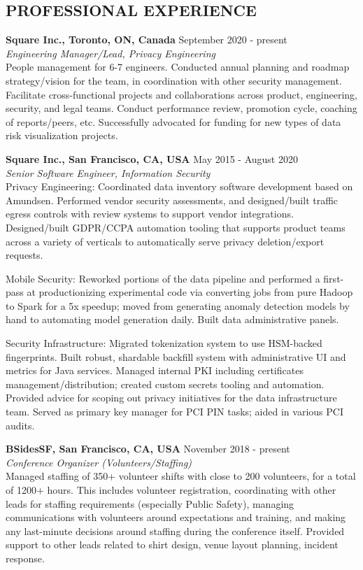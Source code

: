\documentclass[line,margin]{res}
\begin{document}

\address{https://www.shh.sh}
\address{s@shh.sh}
\begin{resume}

\section{PROFESSIONAL EXPERIENCE}
{\bf Square Inc., Toronto, ON, Canada} \hfill {September 2020 - present} \\
{\sl Engineering Manager/Lead, Privacy Engineering}\\
People management for 6-7 engineers. Conducted annual planning and roadmap strategy/vision for the team, in coordination with other security management. Facilitate cross-functional projects and collaborations across product, engineering, security, and legal teams. Conduct performance review, promotion cycle, coaching of reports/peers, etc. Successfully advocated for funding for new types of data risk visualization projects.

{\bf Square Inc., San Francisco, CA, USA} \hfill {May 2015 - August 2020} \\
{\sl Senior Software Engineer, Information Security}\\
Privacy Engineering: Coordinated data inventory software development based on Amundsen. Performed vendor security assessments, and designed/built traffic egress controls with review systems to support vendor integrations. Designed/built GDPR/CCPA automation tooling that supports product teams across a variety of verticals to automatically serve privacy deletion/export requests.

Mobile Security: Reworked portions of the data pipeline and performed a first-pass at productionizing experimental code via converting jobs from pure Hadoop to Spark for a 5x speedup; moved from generating anomaly detection models by hand to automating model generation daily. Built data administrative panels. 

Security Infrastructure: Migrated tokenization system to use HSM-backed fingerprints. Built robust, shardable backfill system with administrative UI and metrics for Java services. Managed internal PKI including certificates management/distribution; created custom secrets tooling and automation. Provided advice for scoping out privacy initiatives for the data infrastructure team. Served as primary key manager for PCI PIN tasks; aided in various PCI audits.

{\bf BSidesSF, San Francisco, CA, USA}  \hfill {November 2018 - present} \\
{\sl Conference Organizer (Volunteers/Staffing)}\\
Managed staffing of 350+ volunteer shifts with close to 200 volunteers, for a total of 1200+ hours. This includes volunteer registration, coordinating with other leads for staffing requirements (especially Public Safety), managing communications with volunteers around expectations and training, and making any last-minute decisions around staffing during the conference itself. Provided support to other leads related to shirt design, venue layout planning, incident response.


\end{resume}
\end{document}
